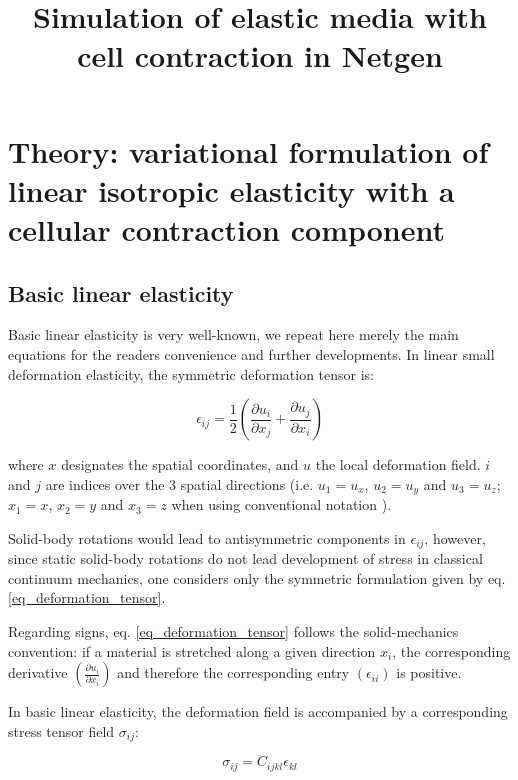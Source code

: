 \documentclass[11pt]{amsart}
\title{Simulation of elastic media with cell contraction in Netgen}
\author{}
\begin{document}
\maketitle



\section{Theory: variational formulation of linear isotropic elasticity with a cellular contraction component}

\subsection{Basic linear elasticity}

Basic linear elasticity is very well-known\cite{bower_applied_2010,slaughter_linearized_2002}, we repeat here merely the main equations for the readers convenience and further developments. In linear small deformation elasticity, the symmetric deformation tensor is:

\begin{equation}
\epsilon_{ij}=\frac{1}{2}\left(\frac{\partial u_i}{\partial x_j}+\frac{\partial u_j}{\partial x_i}\right) \label{eq_deformation_tensor}
\end{equation}

where $x$ designates the spatial coordinates, and $u$ the local deformation field. $i$ and $j$ are indices over the 3 spatial directions (i.e. $u_1=u_x$, $u_2=u_y$ and $u_3=u_z$; $x_1=x$, $x_2=y$ and $x_3=z$ when using conventional notation ).

Solid-body rotations would lead to antisymmetric components in $\epsilon_{ij}$, however, since static solid-body rotations do not lead development of stress in classical continuum mechanics, one considers only the symmetric formulation given by eq. \ref{eq_deformation_tensor}.  

Regarding signs, eq. \ref{eq_deformation_tensor} follows the solid-mechanics convention: if a material is stretched along a given direction $x_i$, the corresponding derivative $\left(\frac{\partial u_i}{\partial x_i} \right)$ and therefore the corresponding entry $\left(\epsilon_{ii}\right)$ is positive. 

In basic linear elasticity\cite{slaughter_linearized_2002}, the deformation field is accompanied by a corresponding stress tensor field $\sigma_{ij}$:

\begin{equation}
\sigma_{ij}=C_{ijkl}\epsilon_{kl} \label{C_stress_tensor}
\end{equation}
\end{document}

